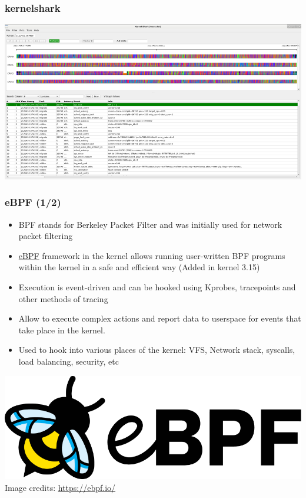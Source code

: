 \begin{frame}
  \frametitle{kernelshark}
  \center\includegraphics[height=0.8\textheight]{slides/debugging-system-wide-profiling/kernelshark.png}
\end{frame}

\begin{frame}
  \frametitle{eBPF (1/2)}
  \begin{itemize}
    \item BPF stands for Berkeley Packet Filter and was initially used
          for network packet filtering
    \item \href{https://ebpf.io/}{eBPF} framework in the kernel allows running
          user-written BPF programs within the kernel in a safe and efficient
          way (Added in kernel 3.15)
    \item Execution is event-driven and can be hooked using Kprobes, tracepoints
          and other methods of tracing
    \item Allow to execute complex actions and report data to userspace for
          events that take place in the kernel.
    \item Used to hook into various places of the kernel: VFS, Network stack,
          syscalls, load balancing, security, etc
  \end{itemize}
  \center\includegraphics[height=0.2\textheight]{slides/debugging-linux-application-stack/logo_ebpf.png}\\ 
  \tiny Image credits: \url{https://ebpf.io/}
\end{frame}

